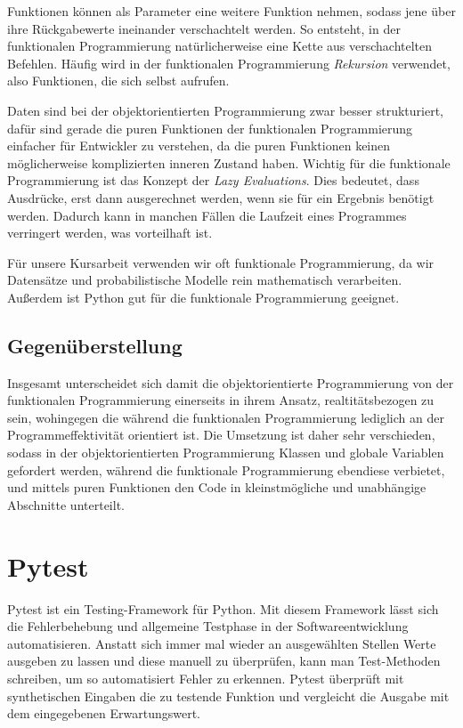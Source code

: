 \documentclass[]{dsadokumentation}
\begin{document}
Funktionen können als Parameter eine weitere Funktion nehmen, sodass jene über ihre Rückgabewerte ineinander verschachtelt werden. So entsteht, in der funktionalen Programmierung natürlicherweise eine Kette aus verschachtelten Befehlen. Häufig wird in der funktionalen Programmierung \emph{Rekursion} verwendet, also Funktionen, die sich selbst aufrufen.

Daten sind bei der objektorientierten Programmierung zwar besser strukturiert, dafür sind gerade die puren Funktionen der funktionalen Programmierung einfacher für Entwickler zu verstehen, da die puren Funktionen keinen möglicherweise komplizierten inneren Zustand haben. Wichtig für die funktionale Programmierung ist das Konzept der \emph{Lazy Evaluations}. Dies bedeutet, dass Ausdrücke, erst dann ausgerechnet werden, wenn sie für ein Ergebnis benötigt werden. Dadurch kann in manchen Fällen die Laufzeit eines Programmes verringert werden, was vorteilhaft ist.

Für unsere Kursarbeit verwenden wir oft funktionale Programmierung, da wir Datensätze und probabilistische Modelle rein mathematisch verarbeiten. Außerdem ist Python gut für die funktionale Programmierung geeignet.

\subsection{Gegenüberstellung}
Insgesamt unterscheidet sich damit die objektorientierte Programmierung von der funktionalen Programmierung einerseits in ihrem Ansatz, realtitätsbezogen zu sein, wohingegen die während die funktionalen Programmierung lediglich an der Programmeffektivität orientiert ist. Die Umsetzung ist daher sehr verschieden, sodass in der objektorientierten Programmierung Klassen und globale Variablen gefordert werden, während die funktionale Programmierung ebendiese verbietet, und mittels puren Funktionen den Code in kleinstmögliche und unabhängige Abschnitte unterteilt.

\section{Pytest}
Pytest ist ein Testing-Framework für Python. Mit diesem Framework lässt sich die Fehlerbehebung und allgemeine Testphase in der Softwareentwicklung automatisieren. Anstatt sich immer mal wieder an ausgewählten Stellen Werte ausgeben zu lassen und diese manuell zu überprüfen, kann man Test-Methoden schreiben, um so automatisiert Fehler zu erkennen. Pytest überprüft mit synthetischen Eingaben die zu testende Funktion und vergleicht die Ausgabe mit dem eingegebenen Erwartungswert.
\end{document}
